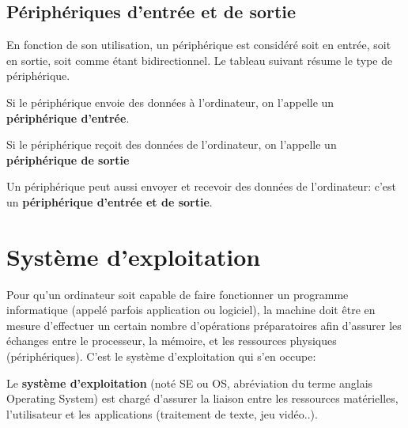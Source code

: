 \documentclass[11pt, a4paper]{book}
\begin{document}
\subsection{Périphériques d'entrée et de sortie}

En fonction de son utilisation, un périphérique est considéré soit en entrée, soit en sortie, soit comme étant bidirectionnel. Le tableau suivant résume le type de périphérique.

Si le périphérique envoie des données à l'ordinateur, on l'appelle un {\bf périphérique d'entrée}.

Si le périphérique reçoit des données de l'ordinateur, on l'appelle un {\bf périphérique de sortie}

Un périphérique peut aussi envoyer et recevoir des données de l'ordinateur: c'est un {\bf périphérique d'entrée et de sortie}.

\section{Système d'exploitation}

Pour qu’un ordinateur soit capable de faire fonctionner un programme informatique (appelé parfois application ou logiciel), la machine doit être en mesure d’effectuer un certain nombre d’opérations préparatoires afin d’assurer les échanges entre le processeur, la mémoire, et les ressources physiques (périphériques). C'est le système d'exploitation qui s'en occupe:

\begin{defi}
	Le {\bf système d’exploitation} (noté SE ou OS, abréviation du terme anglais Operating System) est chargé d’assurer la liaison entre les ressources matérielles, l'utilisateur et les applications (traitement de texte, jeu vidéo..). 
\end{defi}	
\end{document}
